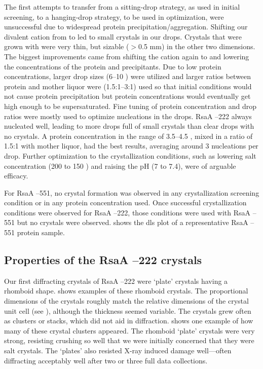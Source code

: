 The first attempts to transfer from a sitting-drop strategy, as used in initial screening, to a hanging-drop strategy, to be used in optimization, were unsuccessful due to widespread protein precipitation/aggregation. Shifting our divalent cation from  to  led to small crystals in our drops. Crystals that were grown with  were very thin, but sizable ($>$0.5 \si{\milli\meter}) in the other two dimensions. The biggest improvements came from shifting the cation again to  and lowering the concentrations of the protein and precipitants. Due to low protein concentrations, larger drop sizes (6--10 \microlitre) were utilized and larger ratios between protein and mother liquor were (1.5:1--3:1) used so that initial conditions would not cause protein precipitation but protein concentrations would eventually get high enough to be supersaturated. Fine tuning of protein concentration and drop ratios were mostly used to optimize nucleations in the drops. RsaA --222 always nucleated well, leading to more drops full of small crystals than clear drops with no crystals. A protein concentration in the range of 3.5--4.5 \mgperml, mixed in a ratio of 1.5:1 with mother liquor, had the best results, averaging around 3 nucleations per drop. Further optimization to the crystallization conditions, such as lowering salt concentration (200 \millimolar to 150 \millimolar) and raising the pH (7 to 7.4), were of arguable efficacy. 

For RsaA --551, no crystal formation was observed in any crystallization screening condition or in any protein concentration used. Once successful crystallization conditions were observed for RsaA --222, those conditions were used with RsaA --551 but no crystals were observed.  shows the \ac{dls} plot of a representative RsaA --551 protein sample.

\subsection{Properties of the RsaA --222 crystals}\label{sec:properties-crystals}
Our first diffracting crystals of RsaA --222 were `plate' crystals having a rhomboid shape.   shows examples of these rhomboid crystals. The proportional dimensions of the crystals roughly match the relative dimensions of the crystal unit cell (see ), although the thickness seemed variable. The crystals grew often as clusters or stacks, which did not aid in diffraction.  shows one example of how many of these crystal clusters appeared. The rhomboid `plate' crystals were very strong, resisting crushing so well that we were initially concerned that they were salt crystals. The `plates' also resisted X-ray induced damage well---often diffracting acceptably well after two or three full data collections. 

